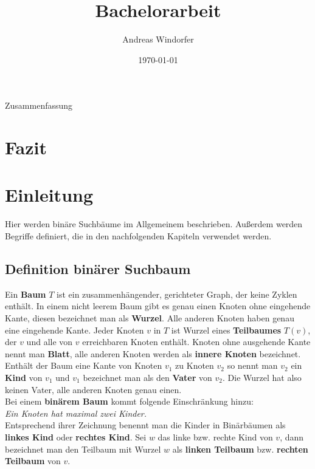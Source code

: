 \documentclass[a4paper,12pt]{article}
\title{Bachelorarbeit}
\author{

	Andreas Windorfer\\
}
\date{\today}
\begin{document}
\maketitle
\newpage
Zusammenfassung
\newpage
\tableofcontents


\newpage

\section{Fazit}
\section {Einleitung}
Hier werden binäre Suchbäume im Allgemeinem beschrieben. Außerdem werden Begriffe definiert, die in den nachfolgenden Kapiteln verwendet werden.\\
\subsection{Definition binärer Suchbaum}
Ein \textbf{Baum} $T$ ist ein zusammenhängender, gerichteter Graph, der keine Zyklen enthält. In einem nicht leerem Baum gibt es genau einen Knoten ohne eingehende Kante, diesen bezeichnet man als \textbf{Wurzel}. Alle anderen Knoten haben genau eine eingehende Kante. Jeder Knoten $v$ in $T$ ist Wurzel eines \textbf{Teilbaumes} $T(v)$, der $v$ und alle von $v$ erreichbaren Knoten enthält. Knoten ohne ausgehende Kante nennt man \textbf{Blatt}, alle anderen Knoten werden als \textbf{innere Knoten} bezeichnet. Enthält der Baum eine Kante von Knoten $v_1$ zu Knoten $v_2$ so nennt man $v_2$ ein \textbf{Kind} von $v_1$ und $v_1$ bezeichnet man als den  \textbf{Vater} von $v_2$. Die Wurzel hat also keinen Vater, alle anderen Knoten genau einen.\\
Bei einem \textbf{binärem Baum} kommt folgende Einschränkung hinzu:  \\
\textit{Ein Knoten hat maximal zwei Kinder.}\\ 
Entsprechend ihrer Zeichnung benennt man die Kinder in Binärbäumen als \textbf{linkes Kind} oder \textbf{rechtes Kind}. Sei $w$ das linke bzw. rechte Kind von $v$, dann bezeichnet man den Teilbaum mit Wurzel $w$ als \textbf{linken Teilbaum} bzw. \textbf{rechten Teilbaum}  von $v$.  
\end{document}
